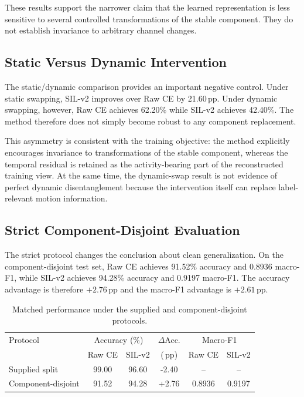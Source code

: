 \documentclass[runningheads]{llncs}
\newcommand{\method}{SIL-v2}
\newcommand{\pp}{\ensuremath{\,\mathrm{pp}}}
\begin{document}
These results support the narrower claim that the learned representation is less sensitive to several controlled transformations of the stable component. They do not establish invariance to arbitrary channel changes.

\subsection{Static Versus Dynamic Intervention}

The static/dynamic comparison provides an important negative control. Under static swapping, \method{} improves over Raw CE by 21.60\pp. Under dynamic swapping, however, Raw CE achieves 62.20\% while \method{} achieves 42.40\%. The method therefore does not simply become robust to any component replacement.

This asymmetry is consistent with the training objective: the method explicitly encourages invariance to transformations of the stable component, whereas the temporal residual is retained as the activity-bearing part of the reconstructed training view. At the same time, the dynamic-swap result is not evidence of perfect dynamic disentanglement because the intervention itself can replace label-relevant motion information.

\subsection{Strict Component-Disjoint Evaluation}

The strict protocol changes the conclusion about clean generalization. On the component-disjoint test set, Raw CE achieves 91.52\% accuracy and 0.8936 macro-F1, while \method{} achieves 94.28\% accuracy and 0.9197 macro-F1. The accuracy advantage is therefore $+2.76\pp$ and the macro-F1 advantage is $+2.61\pp$.

\begin{table}[t]
\centering
\caption{Matched performance under the supplied and component-disjoint protocols.}
\label{tab:strict}
\begin{tabular}{lccccc}
\toprule
Protocol & \multicolumn{2}{c}{Accuracy (\%)} & $\Delta$Acc. & \multicolumn{2}{c}{Macro-F1}\\
& Raw CE & \method{} & (\pp) & Raw CE & \method{}\\
\midrule
Supplied split & 99.00 & 96.60 & -2.40 & -- & --\\
Component-disjoint & 91.52 & 94.28 & +2.76 & 0.8936 & 0.9197\\
\bottomrule
\end{tabular}
\end{table}
\end{document}
